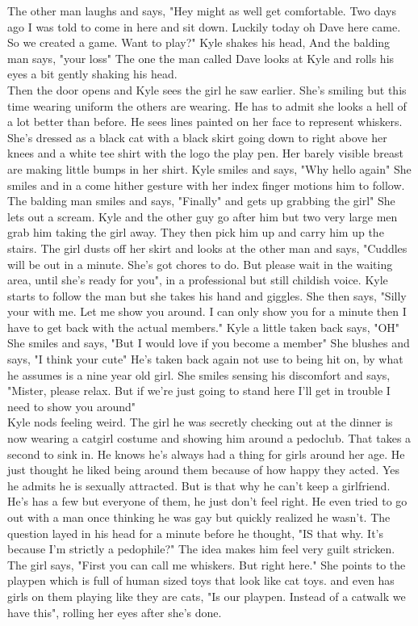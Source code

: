 \documentclass {article}[12pt]
\begin{document}
The other man laughs and says, "Hey might as well get comfortable. Two days ago I was told to come in here and sit down. Luckily today oh Dave here came. So we created a game. Want to play?" Kyle shakes his head, And the balding man says, "your loss" The one the man called Dave looks at Kyle and rolls his eyes a bit gently shaking his head.\\

Then the door opens and Kyle sees the girl he saw earlier. She's smiling but this time wearing uniform the others are wearing. He has to admit she looks a hell of a lot better than before. He sees lines painted on her face to represent whiskers. She's dressed as a black cat with a black skirt going down to right above her knees and a white tee shirt with the logo the play pen. Her barely visible breast are making little bumps in her shirt. Kyle smiles and says, "Why hello again" She smiles and in a come hither gesture with her index finger motions him to follow.\\

The balding man smiles and says, "Finally" and gets up grabbing the girl" She lets out a scream. Kyle and the other guy go after him but two very large men grab him taking the girl away. They then pick him up and carry him up the stairs. The girl dusts off her skirt and looks at the other man and says, "Cuddles will be out in a minute. She's got chores to do. But please wait in the waiting area, until she's ready for you", in a professional but still childish voice. Kyle starts to follow the man but she takes his hand and giggles. She then says, "Silly your with me. Let me show you around. I can only show you for a minute then I have to get back with the actual members." Kyle a little taken back says, "OH" She smiles and says, "But I would love if you become a member" She blushes and says, "I think your cute" He's taken back again not use to being hit on, by what he assumes is a nine year old girl. She smiles sensing his discomfort and says, "Mister, please relax. But if we're just going to stand here I'll get in trouble I need to show you around"\\

Kyle nods feeling weird. The girl he was secretly checking out at the dinner is now wearing a catgirl costume and showing him around a pedoclub. That takes a second to sink in. He knows he's always had a thing for girls around her age. He just thought he liked being around them because of how happy they acted. Yes he admits he is sexually attracted. But is that why he can't keep a girlfriend. He's has a few but everyone of them, he just don't feel right. He even tried to go out with a man once thinking he was gay but quickly realized he wasn't. The question layed in his head for a minute before he thought, "IS that why. It's because I'm strictly a pedophile?" The idea makes him feel very guilt stricken. The girl says, "First you can call me whiskers. But right here." She points to the playpen which is full of human sized toys that look like cat toys. and even has girls on them playing like they are cats, "Is our playpen. Instead of a catwalk we have this", rolling her eyes after she's done. \\
\end{document}
